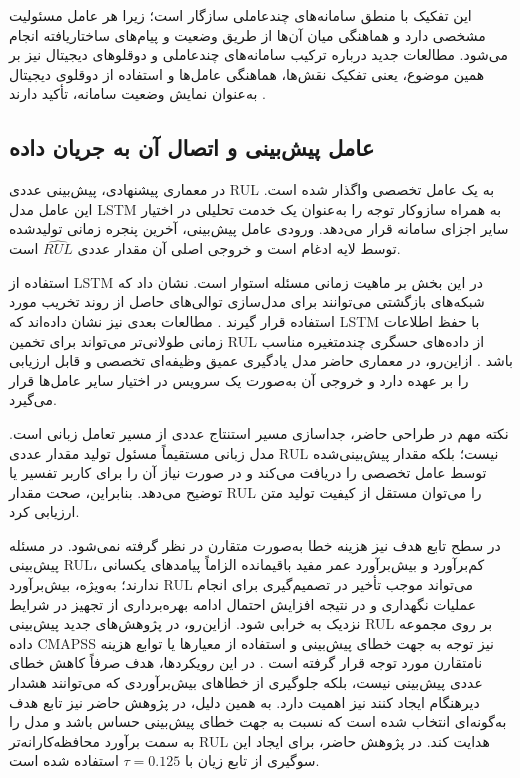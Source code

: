 این تفکیک با منطق سامانه‌های چندعاملی سازگار است؛ زیرا هر عامل
مسئولیت مشخصی دارد و هماهنگی میان آن‌ها از طریق وضعیت و پیام‌های
ساختاریافته انجام می‌شود. مطالعات جدید درباره ترکیب سامانه‌های
چندعاملی و دوقلوهای دیجیتال نیز بر همین موضوع، یعنی تفکیک نقش‌ها،
هماهنگی عامل‌ها و استفاده از دوقلوی دیجیتال به‌عنوان نمایش وضعیت سامانه،
تأکید دارند \cite{lopez2024madtwin,pretel2022masdt}.

\subsection{عامل پیش‌بینی و اتصال آن به جریان داده}
\label{sec:cmapss-prediction-agent}

در معماری پیشنهادی، پیش‌بینی عددی \gls{RUL} به یک عامل تخصصی
واگذار شده است. این عامل مدل \gls{LSTM} به همراه سازوکار توجه را
به‌عنوان یک خدمت تحلیلی در اختیار سایر اجزای سامانه قرار می‌دهد.
ورودی عامل پیش‌بینی، آخرین پنجره زمانی تولیدشده توسط لایه ادغام
است و خروجی اصلی آن مقدار عددی $\widehat{RUL}$ است.

استفاده از \gls{LSTM} در این بخش بر ماهیت زمانی مسئله استوار است.
 نشان داد که شبکه‌های بازگشتی می‌توانند برای مدل‌سازی
توالی‌های حاصل از روند تخریب مورد استفاده قرار گیرند
\cite{heimes2008recurrent}.
 مطالعات بعدی نیز نشان داده‌اند که LSTM با
حفظ اطلاعات زمانی طولانی‌تر می‌تواند برای تخمین \gls{RUL} از
داده‌های حسگری چندمتغیره مناسب باشد \cite{heimes2008recurrent}.
ازاین‌رو، در معماری حاضر مدل یادگیری عمیق وظیفه‌ای تخصصی و
قابل ارزیابی را بر عهده دارد و خروجی آن به‌صورت یک سرویس در
اختیار سایر عامل‌ها قرار می‌گیرد.

نکته مهم در طراحی حاضر، جداسازی مسیر استنتاج عددی از مسیر
تعامل زبانی است. مدل زبانی مستقیماً مسئول تولید مقدار عددی
\gls{RUL} نیست؛ بلکه مقدار پیش‌بینی‌شده توسط عامل تخصصی را
دریافت می‌کند و در صورت نیاز آن را برای کاربر تفسیر یا توضیح
می‌دهد. بنابراین، صحت مقدار \gls{RUL} را می‌توان مستقل از کیفیت
تولید متن ارزیابی کرد.

در سطح تابع هدف نیز هزینه خطا به‌صورت متقارن در نظر گرفته
نمی‌شود. در مسئله پیش‌بینی \gls{RUL}، کم‌برآورد و بیش‌برآورد عمر
مفید باقیمانده الزاماً پیامدهای یکسانی ندارند؛ به‌ویژه، بیش‌برآورد
\gls{RUL} می‌تواند موجب تأخیر در تصمیم‌گیری برای انجام عملیات
نگهداری و در نتیجه افزایش احتمال ادامه بهره‌برداری از تجهیز در
شرایط نزدیک به خرابی شود. ازاین‌رو، در پژوهش‌های جدید پیش‌بینی
\gls{RUL} بر روی مجموعه داده \gls{CMAPSS} نیز توجه به جهت خطای
پیش‌بینی و استفاده از معیارها یا توابع هزینه نامتقارن مورد توجه
قرار گرفته است \cite{he2025bilstmgru,zhang2026multistatistic,dong2026bidirectional}. 
در این رویکردها، هدف صرفاً کاهش خطای عددی پیش‌بینی نیست، بلکه
جلوگیری از خطاهای بیش‌برآوردی که می‌توانند هشدار دیرهنگام ایجاد
کنند نیز اهمیت دارد. به همین دلیل، در پژوهش حاضر نیز تابع هدف
به‌گونه‌ای انتخاب شده است که نسبت به جهت خطای پیش‌بینی حساس باشد
و مدل را به سمت برآورد محافظه‌کارانه‌تر \gls{RUL} هدایت کند. در پژوهش حاضر، برای ایجاد
این سوگیری از تابع زیان  با
$\tau=0.125$ استفاده شده است.

